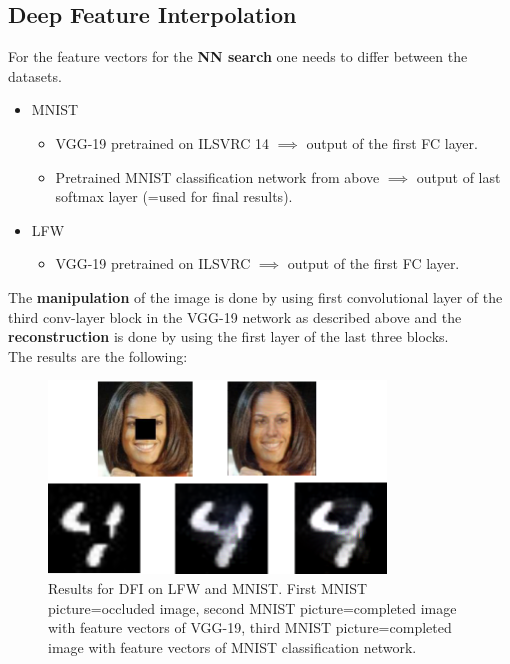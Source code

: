 \documentclass[
     11pt,         %
     a4paper,      %
     oneside,
     ]{article}
\begin{document}
\subsection{Deep Feature Interpolation}
For the feature vectors for the \textbf{NN search} one needs to differ between the datasets.
\begin{itemize}
  \item MNIST
  \begin{itemize}
    \item VGG-19 pretrained on ILSVRC 14 $\implies$ output of the first FC layer.
    \item Pretrained MNIST classification network from above $\implies$ output of last softmax layer (=used for final results).
  \end{itemize}
  \item LFW
  \begin{itemize}
    \item VGG-19 pretrained on ILSVRC $\implies$ output of the first FC layer.
  \end{itemize}
\end{itemize}
The \textbf{manipulation} of the image is done by using first convolutional layer of the third conv-layer block in the VGG-19 network as described above and the \textbf{reconstruction} is done by using the first layer of the last three blocks.\\
The results are the following:
  \begin{figure}[H]
    \begin{center}
      \includegraphics[width=0.8\textwidth]{images/DFI-final2.png}
      \caption{Results for DFI on LFW and MNIST. First MNIST picture=occluded image, second MNIST picture=completed image with feature vectors of VGG-19, third MNIST picture=completed image with feature vectors of MNIST classification network.}
    \end{center}
  \end{figure}
\end{document}
